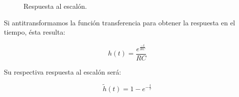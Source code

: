 \begin{figure}[H]
\qquad
{}%
\caption{Respuesta al escalón.}
\label{fig:diagesc}
\end{figure}

Si antitransformamos la función transferencia para obtener la respuesta en el tiempo, ésta resulta:
\begin{center}
\begin{equation}
\label{eq:transfentiempo}
h(t)=\frac{e^{\frac{-t}{RC}}}{RC}
\end{equation}
\end{center}

Su respectiva respuesta al escalón será:
\begin{center}
\begin{equation}
\label{eq:escalon}
\widetilde{h}(t)=1 - e^{-\frac{t}{\tau}}
\end{equation}
\end{center}

